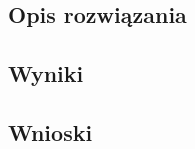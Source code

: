 \documentclass{classrep}
\begin{document}
	\subsection{Opis rozwiązania}
		
	\subsection{Wyniki}
	\subsection{Wnioski}
\end{document}
